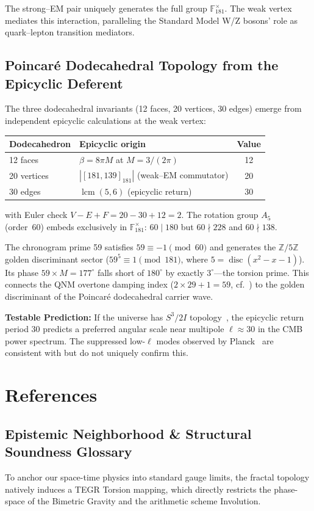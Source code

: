 The strong--EM pair uniquely generates the full group $\mathbb{F}_{181}^{\times}$. The weak vertex mediates this interaction, paralleling the Standard Model W/Z bosons' role as quark--lepton transition mediators.

\subsection{Poincar\'{e} Dodecahedral Topology from the Epicyclic Deferent}

The three dodecahedral invariants (12 faces, 20 vertices, 30 edges) emerge from independent epicyclic calculations at the weak vertex:
\begin{center}
\begin{tabular}{llc}
\hline
Dodecahedron & Epicyclic origin & Value \\
\hline
12 faces & $\beta = 8\pi M$ at $M = 3/(2\pi)$ & 12 \\
20 vertices & $|[181,139]_{181}|$ (weak--EM commutator) & 20 \\
30 edges & $\operatorname{lcm}(5, 6)$ (epicyclic return) & 30 \\
\hline
\end{tabular}
\end{center}
with Euler check $V - E + F = 20 - 30 + 12 = 2$. The rotation group $A_5$ (order~60) embeds exclusively in $\mathbb{F}_{181}^{\times}$: $60 \mid 180$ but $60 \nmid 228$ and $60 \nmid 138$.

The chronogram prime 59 satisfies $59 \equiv -1 \pmod{60}$ and generates the $\mathbb{Z}/5\mathbb{Z}$ golden discriminant sector ($59^5 \equiv 1 \pmod{181}$, where $5 = \operatorname{disc}(x^2 - x - 1)$). Its phase $59 \times M = 177^{\circ}$ falls short of $180^{\circ}$ by exactly $3^{\circ}$---the torsion prime. This connects the QNM overtone damping index ($2 \times 29 + 1 = 59$, cf.~\cite{hod1998, motl2003}) to the golden discriminant of the Poincar\'{e} dodecahedral carrier wave.

\textbf{Testable Prediction:} If the universe has $S^3/2I$ topology~\cite{luminet2003}, the epicyclic return period 30 predicts a preferred angular scale near multipole $\ell \approx 30$ in the CMB power spectrum. The suppressed low-$\ell$ modes observed by Planck~\cite{planck2020} are consistent with but do not uniquely confirm this.

\section{References}

\subsection*{Epistemic Neighborhood \& Structural Soundness Glossary}
To anchor our space-time physics into standard gauge limits, the fractal topology natively induces a TEGR Torsion mapping, which directly restricts the phase-space of the Bimetric Gravity and the arithmetic scheme Involution.


